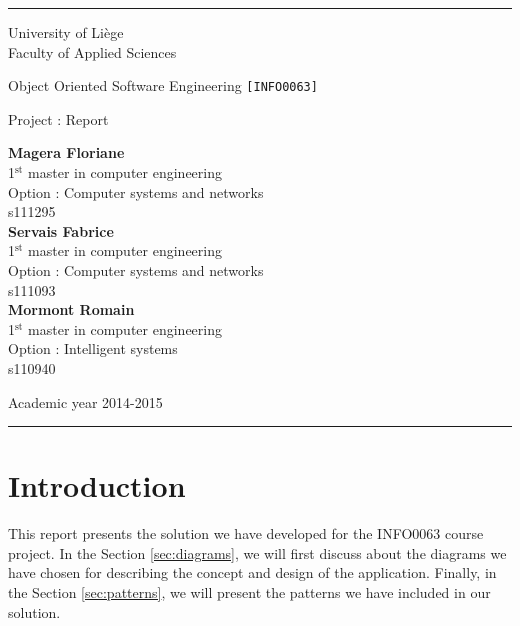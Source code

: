 \documentclass[a4paper,11pt]{article}
\begin{document}
\rule{1\linewidth}{1px}
{ \sc
\begin{center}
{\small University of Liège}\\
{\small Faculty of Applied Sciences}

\end{center}

\vfill
\begin{center}

{\Huge Object Oriented Software Engineering {\LARGE \tt [INFO0063]}\\}
\end{center}
\begin{center}
{\Huge Project : Report}
\end{center}
\begin{center}
\textbf{Magera Floriane}\\
{\small 1$^{\text{st}}$ master in computer engineering}\\
{\small Option : Computer systems and networks}\\
{\small s111295}\\
\vspace{0.5cm}
\textbf{Servais Fabrice}\\
{\small 1$^{\text{st}}$ master in computer engineering}\\
{\small Option : Computer systems and networks}\\
{\small s111093}\\
\vspace{0.5cm}
\textbf{Mormont Romain}\\
{\small 1$^{\text{st}}$ master in computer engineering}\\
{\small Option : Intelligent systems}\\
{\small s110940}
\end{center}

\vfill
\begin{center}
Academic year 2014-2015\\
\end{center}
}
\rule{1\linewidth}{1px}
\newpage
\tableofcontents
\newpage

\section{Introduction}

This report presents the solution we have developed for the INFO0063 course project. In the Section \ref{sec:diagrams}, we will first discuss about the diagrams we have chosen for describing the concept and design of the application. Finally, in the Section \ref{sec:patterns}, we will present the patterns we have included in our solution.
\end{document}
